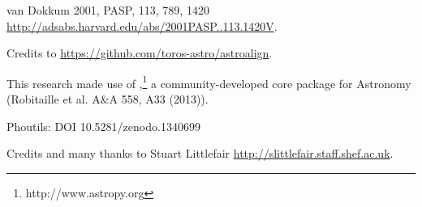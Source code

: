 \documentclass[a4paper, 11pt, fleqn]{memoir}
\begin{document}
van Dokkum 2001, PASP, 113, 789, 1420
\url{http://adsabs.harvard.edu/abs/2001PASP..113.1420V}.

Credits to \url{https://github.com/toros-astro/astroalign}.

This research made use of ,\footnote{http://www.astropy.org} a community-developed core  package for Astronomy (Robitaille et al.
A\&A 558, A33 (2013)).

Phoutils: DOI 10.5281/zenodo.1340699

Credits and many thanks to Stuart Littlefair \url{http://slittlefair.staff.shef.ac.uk}.







\end{document}
